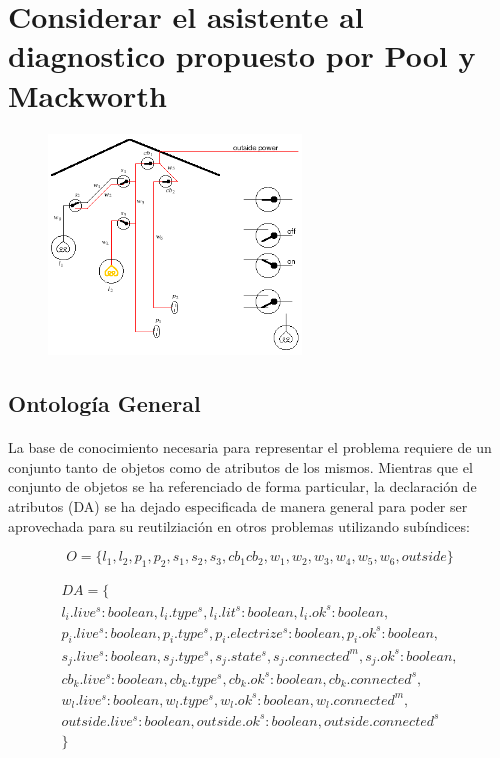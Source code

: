 \documentclass[10pt, a4paper,spanish]{article}
\begin{document}
	\clearpage
	\section{Considerar el asistente al diagnostico propuesto por Pool y Mackworth}

		\begin{figure}[H]
			\begin{center}
				\includegraphics[width=0.6\textwidth]{diagnostic-assistant}
			\end{center}
		\end{figure}

		\subsection{Ontología General}

			\paragraph{}
			La base de conocimiento necesaria para representar el problema requiere de un conjunto tanto de objetos como de atributos de los mismos. Mientras que el conjunto de objetos se ha referenciado de forma particular, la declaración de atributos (DA) se ha dejado especificada de manera general para poder ser aprovechada para su reutilziación en otros problemas utilizando subíndices:

			\begin{equation*}
				O = \{l_1, l_2, p_1, p_2, s_1, s_2, s_3, cb_1 cb_2, w_1, w_2, w_3, w_4, w_5, w_6, outside\}
			\end{equation*}

			\begin{multline*}
				DA = \{ \\
					l_i.live^s:boolean, l_i.type^s, l_i.lit^s:boolean, l_i.ok^s:boolean, \\
					p_i.live^s:boolean, p_i.type^s, p_i.electrize^s:boolean, p_i.ok^s:boolean, \\
					s_j.live^s:boolean, s_j.type^s, s_j.state^s, s_j.connected^m, s_j.ok^s:boolean, \\
					cb_k.live^s:boolean, cb_k.type^s, cb_k.ok^s:boolean, cb_k.connected^s, \\
					w_l.live^s:boolean, w_l.type^s, w_l.ok^s:boolean, w_l.connected^m, \\
					outside.live^s:boolean, outside.ok^s:boolean, outside.connected^s \\
				\}
			\end{multline*}
\end{document}
